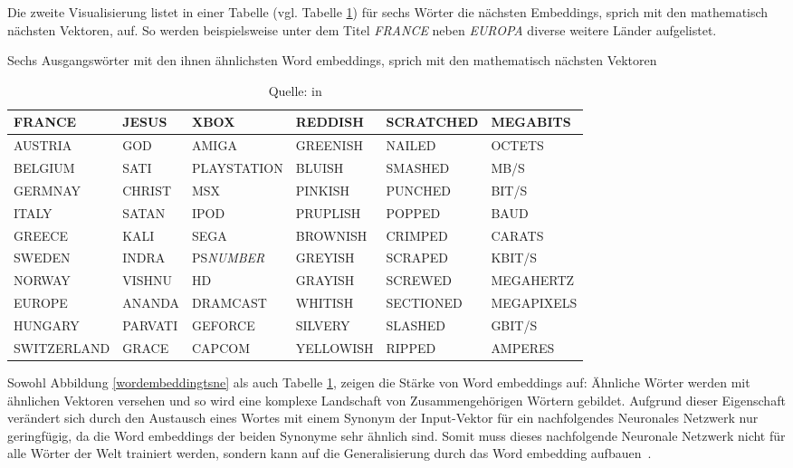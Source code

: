 Die zweite Visualisierung listet in einer Tabelle (vgl. Tabelle \ref{wordembeddingtable}) für sechs Wörter die nächsten Embeddings, sprich mit den mathematisch nächsten Vektoren, auf. So werden beispielsweise unter dem Titel \textit{FRANCE} neben \textit{EUROPA} diverse weitere Länder aufgelistet.
\begin{table}[h!]
\centering
    \captionsetup{width=.9\linewidth}
    \caption[Ähnlichkeit von sechs Word-Embeddings]{Sechs Ausgangswörter mit den ihnen ähnlichsten Word embeddings, sprich mit den mathematisch nächsten Vektoren}
    \label{wordembeddingtable}
    \renewcommand{\arraystretch}{1.25}
    \setlength{\tabcolsep}{3pt}
    \footnotesize
    \begin{tabular}{ | l | l | l | l | l | l |}
    \hline
    \rowcolor{ccc} FRANCE & JESUS & XBOX & REDDISH & SCRATCHED & MEGABITS \\ \hline
    AUSTRIA & GOD & AMIGA & GREENISH & NAILED & OCTETS \\ \hline
    BELGIUM & SATI & PLAYSTATION & BLUISH & SMASHED & MB/S \\ \hline
    GERMNAY& CHRIST & MSX & PINKISH & PUNCHED & BIT/S \\ \hline
    ITALY & SATAN & IPOD & PRUPLISH & POPPED & BAUD \\ \hline
    GREECE & KALI & SEGA & BROWNISH & CRIMPED & CARATS \\ \hline
    SWEDEN & INDRA & PS\textit{NUMBER} & GREYISH & SCRAPED & KBIT/S \\ \hline
    NORWAY & VISHNU & HD & GRAYISH & SCREWED & MEGAHERTZ \\ \hline
    EUROPE & ANANDA & DRAMCAST & WHITISH & SECTIONED & MEGAPIXELS \\ \hline
    HUNGARY & PARVATI & GEFORCE & SILVERY & SLASHED & GBIT/S \\ \hline
    SWITZERLAND & GRACE & CAPCOM & YELLOWISH & RIPPED & AMPERES \\ \hline
    \end{tabular}
    \caption*{Quelle: \textcite{Collobert2011} in \textcite{Olah2014b}}
\end{table}

Sowohl Abbildung \ref{wordembeddingtsne} als auch Tabelle \ref{wordembeddingtable}, zeigen die Stärke von Word embeddings auf: Ähnliche Wörter werden mit ähnlichen Vektoren versehen und so wird eine komplexe Landschaft von Zusammengehörigen Wörtern gebildet. Aufgrund dieser Eigenschaft verändert sich durch den Austausch eines Wortes mit einem Synonym der Input-Vektor für ein nachfolgendes Neuronales Netzwerk nur geringfügig, da die Word embeddings der beiden Synonyme sehr ähnlich sind. Somit muss dieses nachfolgende Neuronale Netzwerk nicht für alle Wörter der Welt trainiert werden, sondern kann auf die Generalisierung durch das Word embedding aufbauen~\autocite{Olah2014b}.

